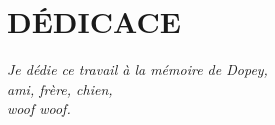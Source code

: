 \chapter*{DÉDICACE}\thispagestyle{headings}
\begin{flushright}
  \itshape
  Je dédie ce travail à la mémoire de Dopey,\\
  ami, frère, chien,\\
  woof woof.
\end{flushright}
\setcounter{page}{3}
